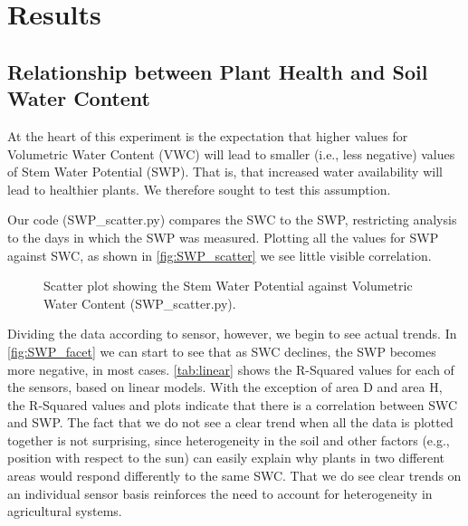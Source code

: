\documentclass[12pt]{scrartcl}
\begin{document}
\section{Results}
\subsection{Relationship between Plant Health and Soil Water Content}
At the heart of this experiment is the expectation that higher values for Volumetric Water Content (VWC) will lead to smaller (i.e., less negative) values of Stem Water Potential (SWP). That is, that increased water availability will lead to healthier plants. We therefore sought to test this assumption.

Our code (SWP\_scatter.py) compares the SWC to the SWP, restricting analysis to the days in which the SWP was measured. Plotting all the values for SWP against SWC, as shown in \autoref{fig:SWP_scatter} we see little visible correlation.

\begin{figure}[!htb]
        \caption{\label{fig:SWP_scatter} Scatter plot showing the Stem Water Potential against Volumetric Water Content (SWP\_scatter.py).}
\end{figure}

Dividing the data according to sensor, however, we begin to see actual trends. In \autoref{fig:SWP_facet} we can start to see that as SWC declines, the SWP becomes more negative, in most cases. \autoref{tab:linear} shows the R-Squared values for each of the sensors, based on linear models. With the exception of area D and area H, the R-Squared values and plots indicate that there is a correlation between SWC and SWP. The fact that we do not see a clear trend when all the data is plotted together is not surprising, since heterogeneity in the soil and other factors (e.g., position with respect to the sun) can easily explain why plants in two different areas would respond differently to the same SWC. That we do see clear trends on an individual sensor basis reinforces the need to account for heterogeneity in agricultural systems.
\end{document}
